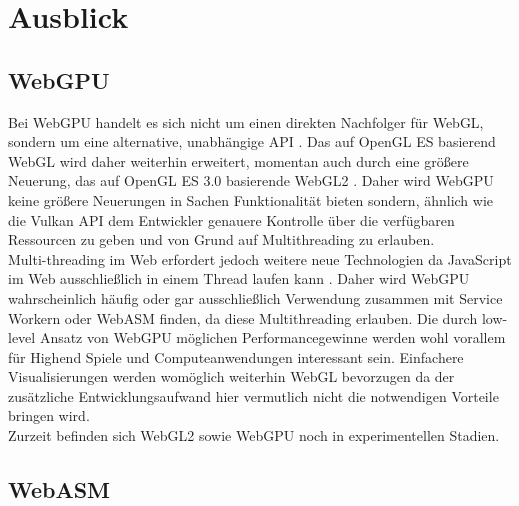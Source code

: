 \section{Ausblick}
\subsection{WebGPU}
Bei WebGPU handelt es sich nicht um einen direkten Nachfolger für WebGL, sondern um eine alternative, unabhängige API \cite{WebGPUIntro}. Das auf OpenGL ES basierend WebGL wird daher weiterhin erweitert, momentan auch durch eine größere Neuerung, das auf OpenGL ES 3.0 basierende WebGL2 \cite{WebGL2}. Daher wird WebGPU keine größere Neuerungen in Sachen Funktionalität bieten sondern, ähnlich wie die Vulkan API dem Entwickler genauere Kontrolle über die verfügbaren Ressourcen zu geben und von Grund auf Multithreading zu erlauben. \\
Multi-threading im Web erfordert jedoch weitere neue Technologien da JavaScript im Web ausschließlich in einem Thread laufen kann \cite{JSConcurrency}. Daher wird WebGPU wahrscheinlich häufig oder gar ausschließlich Verwendung zusammen mit Service Workern oder \ac{WebASM} finden, da diese Multithreading erlauben.
Die durch low-level Ansatz von WebGPU möglichen Performancegewinne werden wohl vorallem für Highend Spiele und Computeanwendungen interessant sein. Einfachere Visualisierungen werden womöglich weiterhin WebGL bevorzugen da der zusätzliche Entwicklungsaufwand hier vermutlich nicht die notwendigen Vorteile bringen wird. \\
Zurzeit befinden sich WebGL2 sowie WebGPU noch in experimentellen Stadien.
\subsection{\acl{WebASM}}
